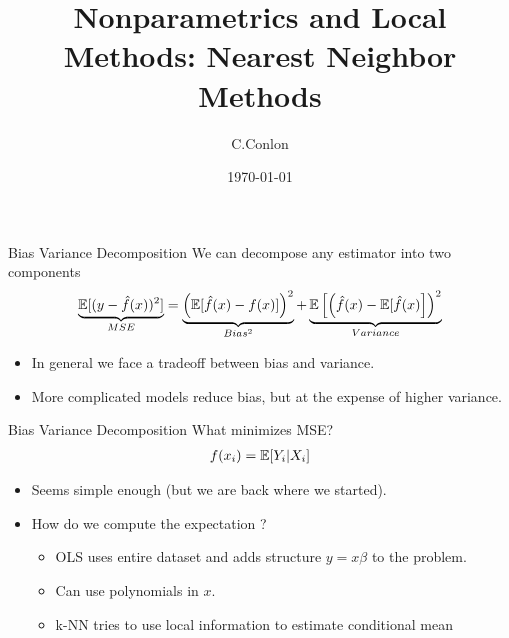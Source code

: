

\title [Nonparametrics]{Nonparametrics and Local Methods: Nearest Neighbor Methods}
\author{C.Conlon}
\date{\today}


\begin{frame}
\titlepage
\end{frame}

\begin{frame}{Bias Variance Decomposition}
We can decompose any estimator into two components
\begin{align*}
\underbrace{\mathbb{E}[(y- \hat{f}(x))^2]}_{MSE} =\underbrace{\left( \mathbb{E}[\hat{f}(x) - f(x)] \right)^2}_{Bias^2}  +  \underbrace{\mathbb{E} \left[ \left(\hat{f}(x) -\mathbb{E}[\hat{f}(x) \right] \right)^2}_{Variance} 
\end{align*}
\begin{itemize}
\item In general we face a tradeoff between bias and variance.
\item More complicated models reduce \alert{bias}, but at the expense of higher \alert{variance}.
\end{itemize}
\end{frame}

\begin{frame}{Bias Variance Decomposition}
What minimizes MSE?
\begin{align*}
f(x_i) = \mathbb{E}[Y_i | X_i] 
\end{align*}
\begin{itemize}
\item Seems simple enough (but we are back where we started).
\item How do we compute the expectation ?
\begin{itemize}
\item OLS uses entire dataset and adds structure $ y = x \beta$ to the problem.
\item Can use polynomials in $x$.
\item k-NN tries to use local information to estimate conditional mean
\end{itemize}
\end{itemize}
\end{frame}



